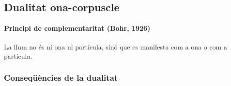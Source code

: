 \subsection{Dualitat ona-corpuscle}
\paragraph{Principi de complementaritat (Bohr, 1926)}
La llum no és ni ona ni partícula, sinó que es manifesta com a ona o com a partícula.

\subsubsection*{Conseqüències de la dualitat}